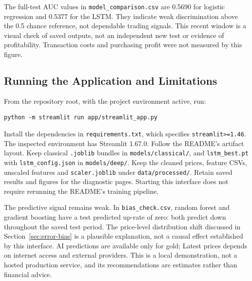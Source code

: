 The full-test AUC values in \texttt{model\_comparison.csv} are 0.5690 for
logistic regression and 0.5377 for the LSTM. They indicate weak discrimination
above the 0.5 chance reference, not dependable trading signals. This recent
window is a visual check of saved outputs, not an independent new test or
evidence of profitability. Transaction costs and purchasing profit were not
measured by this figure.

\subsection{Running the Application and Limitations}
From the repository root, with the project environment active, run:
\begin{verbatim}
python -m streamlit run app/streamlit_app.py
\end{verbatim}
Install the dependencies in \texttt{requirements.\allowbreak txt}, which
specifies \texttt{streamlit>=1.46}. The inspected environment has Streamlit
1.67.0. Follow the README's artifact layout. Keep classical \texttt{.joblib}
bundles in \texttt{models/\allowbreak classical/}, and
\texttt{lstm\_\allowbreak best.\allowbreak pt} with
\texttt{lstm\_\allowbreak config.\allowbreak json} in
\texttt{models/\allowbreak deep/}. Keep the cleaned prices, feature CSVs,
unscaled features and \texttt{scaler.\allowbreak joblib} under
\texttt{data/\allowbreak processed/}. Retain saved results and figures for
the diagnostic pages. Starting this interface does not require rerunning
the README's training pipeline.

The predictive signal remains weak. In \texttt{bias\_check.csv}, random
forest and gradient boosting have a test predicted up-rate of zero: both
predict down throughout the saved test period. The price-level distribution
shift discussed in Section~\ref{sec:error-bias} is a plausible explanation,
not a causal effect established by this interface. AI predictions are
available only for gold; Latest prices depends on internet access and
external providers. This is a local demonstration, not a hosted production
service, and its recommendations are estimates rather than financial advice.
